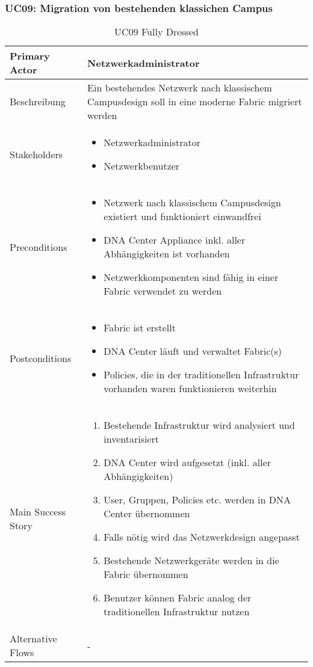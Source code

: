 \subsubsection{UC09: Migration von bestehenden klassichen Campus}
\begin{table}[H]
	\centering
	\begin{tabularx}{\textwidth}{l | X}
		Primary Actor   & Netzwerkadministrator       \\
		\hline
		Beschreibung   & Ein bestehendes Netzwerk nach klassischem Campusdesign soll in eine moderne Fabric migriert werden  \\ 
		\hline
		Stakeholders       & 
		\begin{itemize}
			\item Netzwerkadministrator
			\item Netzwerkbenutzer
		\end{itemize} \\ 
		Preconditions      &
		\begin{itemize}	
			\item Netzwerk nach klassischem Campusdesign existiert und funktioniert einwandfrei
			\item DNA Center Appliance inkl. aller Abhängigkeiten ist vorhanden
			\item Netzwerkkomponenten sind fähig in einer Fabric verwendet zu werden
		\end{itemize}  \\
		\hline
		Postconditions     & 
		\begin{itemize}	
			\item Fabric ist erstellt
			\item DNA Center läuft und verwaltet Fabric(s)
			\item Policies, die in der traditionellen Infrastruktur vorhanden waren funktionieren weiterhin
		\end{itemize}  \\
		\hline
		Main Success Story & 
		\begin{enumerate}
			\item Bestehende Infrastruktur wird analysiert und inventarisiert
			\item DNA Center wird aufgesetzt (inkl. aller Abhängigkeiten)
			\item User, Gruppen, Policies etc. werden in DNA Center übernommen
			\item Falls nötig wird das Netzwerkdesign angepasst
			\item Bestehende Netzwerkgeräte werden in die Fabric übernommen
			\item Benutzer können Fabric analog der traditionellen Infrastruktur nutzen
		\end{enumerate}
		\\
		\hline
		Alternative Flows  & -
	\end{tabularx}
	\caption{UC09 Fully Dressed}
	\label{tab:UC09}
\end{table}

